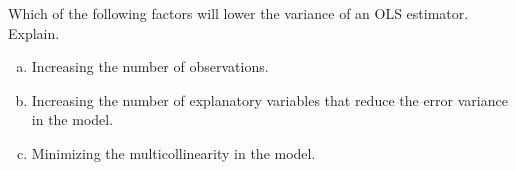 \item Which of the following factors will lower the variance of an OLS estimator. Explain. %
	\begin{enumerate}[a.] 
		\item Increasing the number of observations.
		\item Increasing the number of explanatory variables that reduce the error variance in the model.
		\item Minimizing the multicollinearity in the model.
	\end{enumerate}